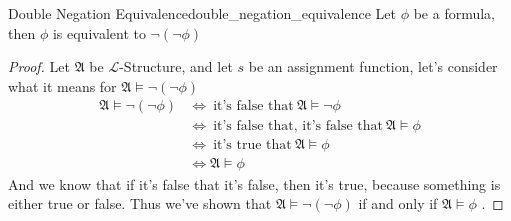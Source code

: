 \begin{proposition}{Double Negation Equivalence}{double_negation_equivalence}
Let $ \phi  $ be a formula, then $ \phi  $ is equivalent to $ \neg \left( \neg \phi  \right)  $ 
\end{proposition}
\begin{proof}
    Let $ \mathfrak{ A }   $ be $\mathcal{L}$-Structure, and let $ s $ be an assignment function, let's consider what it means for $ \mathfrak{ A } \models \neg \left( \neg \phi  \right)   $ 
    \begin{align*}
        \mathfrak{ A } \models \neg \left( \neg \phi  \right)  &\Leftrightarrow  ~\text{it's false that}~  \mathfrak{ A } \models \neg \phi  \\
                                                               &\Leftrightarrow ~\text{it's false that, it's false that}~ \mathfrak{ A } \models \phi  \\
                                                               &\Leftrightarrow ~\text{it's true that}~  \mathfrak{ A } \models \phi \\
                                                               &\Leftrightarrow  \mathfrak{ A } \models \phi  
    \end{align*}
    And we know that if it's false that it's false, then it's true, because something is either true or false. Thus we've shown that $ \mathfrak{ A } \models \neg \left( \neg \phi  \right)   $ if and only if $ \mathfrak{ A } \models \phi   $ .
\end{proof}
